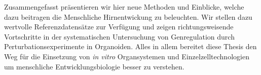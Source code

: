 Zusammengefasst präsentieren wir hier neue Methoden und Einblicke, welche dazu beitragen die Menschliche Hirnentwickung zu beleuchten. Wir stellen dazu wertvolle Referenzdatensätze zur Verfügung und zeigen richtungsweisende Vortschritte in der systematischen Untersuchung von Genregulation durch Perturbationsexperimente in Organoiden. Alles in allem bereitet diese Thesis den Weg für die Einsetzung von \textit{in vitro} Organsystemen und Einzelzelltechnologien um menschliche Entwicklungsbiologie besser zu verstehen.